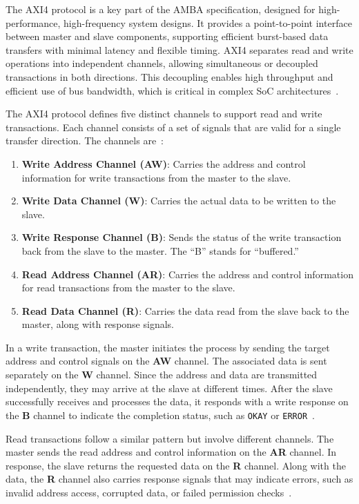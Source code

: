 The \ac{AXI4} protocol is a key part of the AMBA specification, designed for high-performance, high-frequency system designs. It provides a point-to-point interface between master and slave components, supporting efficient burst-based data transfers with minimal latency and flexible timing. AXI4 separates read and write operations into independent channels, allowing simultaneous or decoupled transactions in both directions. This decoupling enables high throughput and efficient use of bus bandwidth, which is critical in complex SoC architectures~\cite{arm_ltd_introduction_2020}.


The AXI4 protocol defines five distinct channels to support read and write transactions. Each channel consists of a set of signals that are valid for a single transfer direction. The channels are~\cite{arm_ltd_introduction_2020}:

\begin{enumerate}
    \item \textbf{Write Address Channel (AW)}: Carries the address and control information for write transactions from the master to the slave.
    \item \textbf{Write Data Channel (W)}: Carries the actual data to be written to the slave.
    \item \textbf{Write Response Channel (B)}: Sends the status of the write transaction back from the slave to the master. The “B” stands for “buffered.”
    \item \textbf{Read Address Channel (AR)}: Carries the address and control information for read transactions from the master to the slave.
    \item \textbf{Read Data Channel (R)}: Carries the data read from the slave back to the master, along with response signals.
\end{enumerate}

In a write transaction, the master initiates the process by sending the target address and control signals on the \textbf{AW} channel. The associated data is sent separately on the \textbf{W} channel. Since the address and data are transmitted independently, they may arrive at the slave at different times. After the slave successfully receives and processes the data, it responds with a write response on the \textbf{B} channel to indicate the completion status, such as \texttt{OKAY} or \texttt{ERROR}~\cite{arm_ltd_introduction_2020}.

Read transactions follow a similar pattern but involve different channels. The master sends the read address and control information on the \textbf{AR} channel. In response, the slave returns the requested data on the \textbf{R} channel. Along with the data, the \textbf{R} channel also carries response signals that may indicate errors, such as invalid address access, corrupted data, or failed permission checks~\cite{arm_ltd_introduction_2020}.

